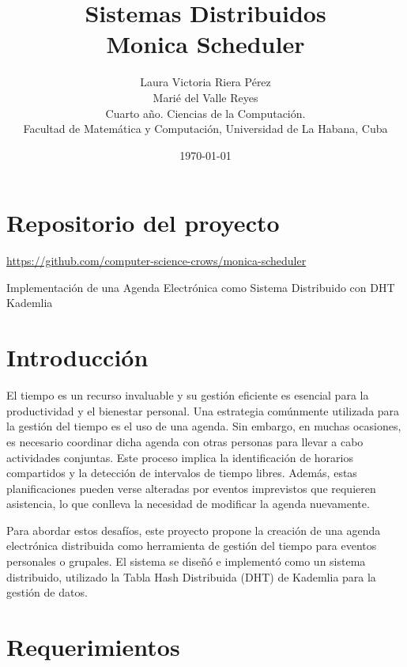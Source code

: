 \documentclass[10pt]{article} %
\title{\normalsize{Sistemas Distribuidos}\\
	\Huge\bfseries Monica Scheduler \\
} %
\author{%
	Laura Victoria Riera P\'erez\\
	Mari\'e del Valle Reyes \vspace{1em} \\
	\small Cuarto a\~no. Ciencias de la Computaci\'on. \\ %
	\small Facultad de Matem\'atica y Computaci\'on, Universidad de La Habana, Cuba \\ %
}
\date{\footnotesize \today } %
\begin{document}
	
	
	
	\maketitle
	
	
	\section*{Repositorio del proyecto}
	
	\begin{center}
		\href{https://github.com/computer-science-crows/monica-scheduler}{https://github.com/computer-science-crows/monica-scheduler}
	\end{center}

	Implementación de una Agenda Electrónica como Sistema Distribuido con DHT Kademlia
	
	\section{Introducción}
	
	El tiempo es un recurso invaluable y su gestión eficiente es esencial para la productividad y el bienestar personal. Una estrategia comúnmente utilizada para la gestión del tiempo es el uso de una agenda. Sin embargo, en muchas ocasiones, es necesario coordinar dicha agenda con otras personas para llevar a cabo actividades conjuntas. Este proceso implica la identificación de horarios compartidos y la detección de intervalos de tiempo libres. Además, estas planificaciones pueden verse alteradas por eventos imprevistos que requieren asistencia, lo que conlleva la necesidad de modificar la agenda nuevamente.
	
	Para abordar estos desafíos, este proyecto propone la creación de una agenda electrónica distribuida como herramienta de gestión del tiempo para eventos personales o grupales. El sistema se diseñó e implementó como un sistema distribuido, utilizado la Tabla Hash Distribuida (DHT) de Kademlia para la gestión de datos.
	
	\section{Requerimientos}
	
\end{document}
